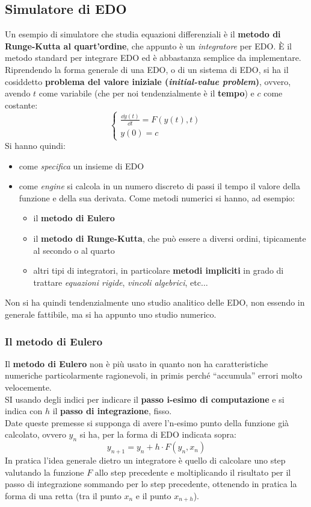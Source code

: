 \documentclass[a4paper,12pt, oneside]{book}
\begin{document}
\subsection{Simulatore di EDO}
Un esempio di simulatore che studia equazioni differenziali è il \textbf{metodo
  di Runge-Kutta al quart'ordine}, che appunto è un 
\textit{integratore} per EDO. È il metodo standard per integrare EDO ed è
abbastanza semplice da implementare.\\
Riprendendo la forma generale di una EDO, o di un sistema di EDO, si ha il
cosiddetto \textbf{problema del valore iniziale (\textit{initial-value
    problem})}, ovvero, avendo $t$ come 
variabile (che per noi tendenzialmente è il \textbf{tempo}) e $c$ come costante:
\[
  \begin{cases}
    \frac{\dd{y(t)}}{\dd{t}}=F(y(t),t)\\
    y(0)=c
  \end{cases}
\]
Si hanno quindi:
\begin{itemize}
  \item come \textit{specifica} un insieme di EDO
  \item come \textit{engine} si calcola in un numero discreto di passi il tempo
  il valore della funzione e della sua derivata. Come metodi numerici si hanno,
  ad esempio:
  \begin{itemize}
    \item il \textbf{metodo di Eulero}
    \item il \textbf{metodo di Runge-Kutta}, che può essere a diversi ordini,
    tipicamente al secondo o al quarto
    \item altri tipi di integratori, in particolare \textbf{metodi impliciti} in
    grado di trattare \textit{equazioni rigide}, \textit{vincoli algebrici},
    etc$\ldots$ 
  \end{itemize}
\end{itemize}
Non si ha quindi tendenzialmente uno studio analitico delle EDO, non essendo in
generale fattibile, ma si ha appunto uno studio numerico.
\subsubsection{Il metodo di Eulero}
Il \textbf{metodo di Eulero} non è più usato in quanto non ha caratteristiche
numeriche particolarmente ragionevoli, in primis perché ``accumula'' errori
molto velocemente. \\
SI usando degli indici per indicare il \textbf{passo i-esimo di computazione} e
si indica con $h$ il \textbf{passo di integrazione}, fisso.\\
Date queste premesse si supponga di avere l'n-esimo punto della funzione già
calcolato, ovvero $y_n$ si ha, per la forma di EDO indicata sopra:
\[y_{n+1}=y_n+h\cdot F(y_n,x_n)\]
In pratica l'idea generale dietro un integratore è quello di calcolare uno step
valutando la funzione $F$ allo step precedente e moltiplicando il risultato per
il passo di integrazione sommando per lo step precedente, ottenendo in pratica
la forma di una retta (tra il punto $x_n$ e il punto $x_{n+h}$).
\end{document}
